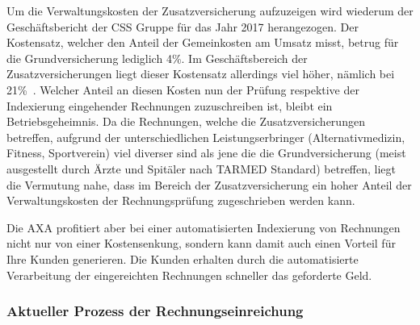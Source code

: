 Um die Verwaltungskosten der Zusatzversicherung aufzuzeigen wird wiederum der Ge\-schäfts\-be\-richt der CSS Gruppe für das Jahr 2017 herangezogen. Der Kostensatz, welcher den Anteil der Gemeinkosten am Umsatz misst, betrug für die Grundversicherung lediglich 4\%. Im Geschäftsbereich der Zusatzversicherungen liegt dieser Kostensatz allerdings viel höher, nämlich bei 21\%~\autocite{CSSGruppe2018}. Welcher Anteil an diesen Kosten nun der Prüfung respektive der Indexierung eingehender Rechnungen zuzuschreiben ist, bleibt ein Betriebsgeheimnis. Da die Rechnungen, welche die Zusatzversicherungen betreffen, aufgrund der unterschiedlichen Leistungserbringer (Alternativmedizin, Fitness, Sportverein) viel diverser sind als jene die die Grundversicherung (meist ausgestellt durch Ärzte und Spitäler nach TARMED Standard) betreffen, liegt die Vermutung nahe, dass im Bereich der Zusatzversicherung ein hoher Anteil der Verwaltungskosten der Rechnungsprüfung zugeschrieben werden kann.

Die AXA profitiert aber bei einer automatisierten Indexierung von Rechnungen nicht nur von einer Kostensenkung, sondern kann damit auch einen Vorteil für Ihre Kunden generieren. Die Kunden erhalten durch die automatisierte Verarbeitung der eingereichten Rechnungen schneller das geforderte Geld.




\subsubsection{Aktueller Prozess der Rechnungseinreichung}

